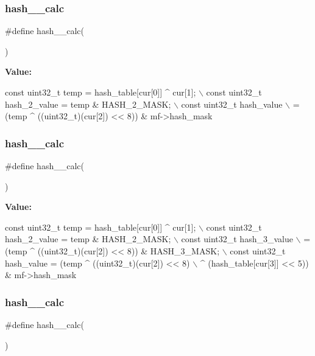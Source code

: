 \subsubsection{hash\+\_\+\_\+calc}
{\footnotesize\ttfamily \#define hash\+\_\+\_\+calc(\begin{DoxyParamCaption}{ }\end{DoxyParamCaption})}

{\bfseries Value\+:}
\begin{DoxyCode}
\textcolor{keyword}{const} uint32\_t temp = hash\_table[cur[0]] ^ cur[1]; \(\backslash\)
        const uint32\_t hash\_2\_value = temp & HASH\_2\_MASK; \(\backslash\)
        const uint32\_t hash\_value \(\backslash\)
                        = (temp ^ ((uint32\_t)(cur[2]) << 8)) & mf->hash\_mask
\end{DoxyCode}
\mbox{\label{lz__encoder__hash_8h_a16cb0485a027625eb95d744a394e5e55}} 
\subsubsection{hash\+\_\+\_\+calc}
{\footnotesize\ttfamily \#define hash\+\_\+\_\+calc(\begin{DoxyParamCaption}{ }\end{DoxyParamCaption})}

{\bfseries Value\+:}
\begin{DoxyCode}
\textcolor{keyword}{const} uint32\_t temp = hash\_table[cur[0]] ^ cur[1]; \(\backslash\)
        const uint32\_t hash\_2\_value = temp & HASH\_2\_MASK; \(\backslash\)
        const uint32\_t hash\_3\_value \(\backslash\)
                        = (temp ^ ((uint32\_t)(cur[2]) << 8)) & HASH\_3\_MASK; \(\backslash\)
        const uint32\_t hash\_value = (temp ^ ((uint32\_t)(cur[2]) << 8) \(\backslash\)
                        ^ (hash\_table[cur[3]] << 5)) & mf->hash\_mask
\end{DoxyCode}
\mbox{\label{lz__encoder__hash_8h_a7666b381a38fd387bb62838449fcc798}} 
\subsubsection{hash\+\_\+\_\+calc}
{\footnotesize\ttfamily \#define hash\+\_\+\_\+calc(\begin{DoxyParamCaption}{ }\end{DoxyParamCaption})}

